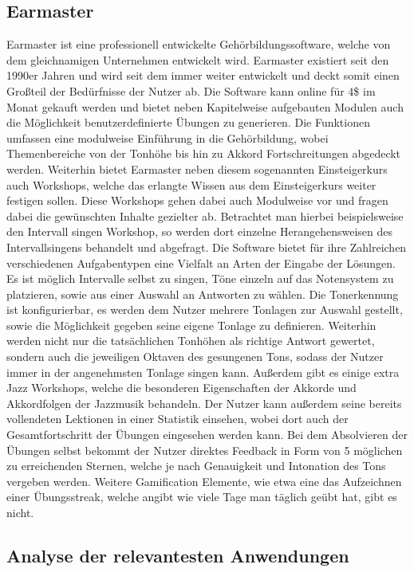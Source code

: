 \subsection*{Earmaster}
\label{sec:Earmaster}
Earmaster ist eine professionell entwickelte Gehörbildungssoftware, welche von dem gleichnamigen Unternehmen entwickelt wird. Earmaster existiert seit den 1990er Jahren und wird seit dem immer weiter entwickelt und deckt somit einen Großteil der Bedürfnisse der Nutzer ab. Die Software kann online für
4\$ im Monat gekauft werden und bietet neben Kapitelweise aufgebauten Modulen auch die Möglichkeit benutzerdefinierte Übungen zu generieren. Die Funktionen umfassen eine modulweise Einführung in die Gehörbildung, wobei Themenbereiche von der Tonhöhe bis hin zu Akkord Fortschreitungen abgedeckt werden. Weiterhin bietet Earmaster neben diesem 
sogenannten Einsteigerkurs auch Workshops, welche das erlangte Wissen aus dem Einsteigerkurs weiter festigen sollen. Diese Workshops gehen dabei auch Modulweise vor und fragen dabei die gewünschten Inhalte gezielter ab. Betrachtet man hierbei beispielsweise den Intervall singen Workshop, 
so werden dort einzelne Herangehensweisen des Intervallsingens behandelt und abgefragt. Die Software bietet für ihre Zahlreichen verschiedenen Aufgabentypen eine Vielfalt an Arten der Eingabe der Lösungen. Es ist möglich Intervalle selbst zu singen, Töne einzeln auf das Notensystem zu platzieren, sowie aus einer Auswahl an 
Antworten zu wählen. Die Tonerkennung ist konfigurierbar, es werden dem Nutzer mehrere Tonlagen zur Auswahl gestellt, sowie die Möglichkeit gegeben seine eigene Tonlage zu definieren. Weiterhin werden nicht nur die tatsächlichen Tonhöhen als richtige Antwort gewertet, sondern auch die jeweiligen Oktaven des gesungenen Tons, sodass der Nutzer 
immer in der angenehmsten Tonlage singen kann. Außerdem gibt es einige extra Jazz Workshops, welche die besonderen Eigenschaften der Akkorde und Akkordfolgen der Jazzmusik behandeln. Der Nutzer kann außerdem seine bereits vollendeten Lektionen
in einer Statistik einsehen, wobei dort auch der Gesamtfortschritt der Übungen eingesehen werden kann. Bei dem Absolvieren der Übungen selbst bekommt der Nutzer direktes Feedback in Form von 5 möglichen zu erreichenden Sternen, welche je nach Genauigkeit und Intonation des Tons vergeben werden. Weitere Gamification Elemente, wie etwa eine 
das Aufzeichnen einer Übungsstreak, welche angibt wie viele Tage man täglich geübt hat, gibt es nicht. \cite{earmaster}

\subsection{Analyse der relevantesten Anwendungen}

